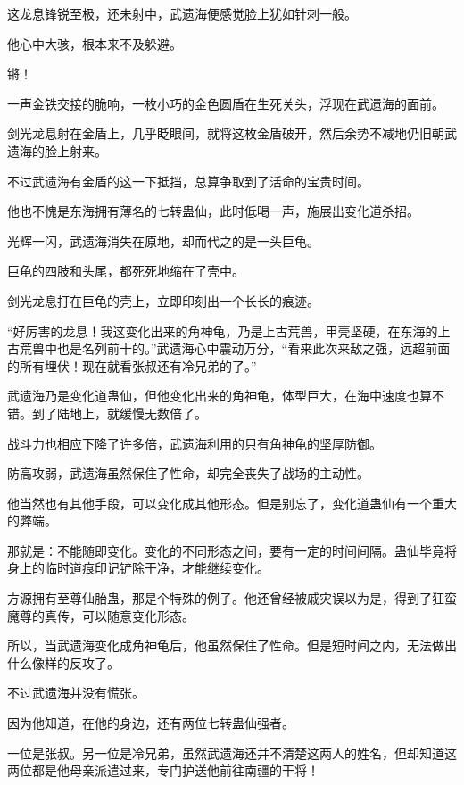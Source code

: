 
\begin{this_body}



这龙息锋锐至极，还未射中，武遗海便感觉脸上犹如针刺一般。

他心中大骇，根本来不及躲避。

锵！

一声金铁交接的脆响，一枚小巧的金色圆盾在生死关头，浮现在武遗海的面前。

剑光龙息射在金盾上，几乎眨眼间，就将这枚金盾破开，然后余势不减地仍旧朝武遗海的脸上射来。

不过武遗海有金盾的这一下抵挡，总算争取到了活命的宝贵时间。

他也不愧是东海拥有薄名的七转蛊仙，此时低喝一声，施展出变化道杀招。

光辉一闪，武遗海消失在原地，却而代之的是一头巨龟。

巨龟的四肢和头尾，都死死地缩在了壳中。

剑光龙息打在巨龟的壳上，立即印刻出一个长长的痕迹。

“好厉害的龙息！我这变化出来的角神龟，乃是上古荒兽，甲壳坚硬，在东海的上古荒兽中也是名列前十的。”武遗海心中震动万分，“看来此次来敌之强，远超前面的所有埋伏！现在就看张叔还有冷兄弟的了。”

武遗海乃是变化道蛊仙，但他变化出来的角神龟，体型巨大，在海中速度也算不错。到了陆地上，就缓慢无数倍了。

战斗力也相应下降了许多倍，武遗海利用的只有角神龟的坚厚防御。

防高攻弱，武遗海虽然保住了性命，却完全丧失了战场的主动性。

他当然也有其他手段，可以变化成其他形态。但是别忘了，变化道蛊仙有一个重大的弊端。

那就是：不能随即变化。变化的不同形态之间，要有一定的时间间隔。蛊仙毕竟将身上的临时道痕印记铲除干净，才能继续变化。

方源拥有至尊仙胎蛊，那是个特殊的例子。他还曾经被戚灾误以为是，得到了狂蛮魔尊的真传，可以随意变化形态。

所以，当武遗海变化成角神龟后，他虽然保住了性命。但是短时间之内，无法做出什么像样的反攻了。

不过武遗海并没有慌张。

因为他知道，在他的身边，还有两位七转蛊仙强者。

一位是张叔。另一位是冷兄弟，虽然武遗海还并不清楚这两人的姓名，但却知道这两位都是他母亲派遣过来，专门护送他前往南疆的干将！


\end{this_body}

